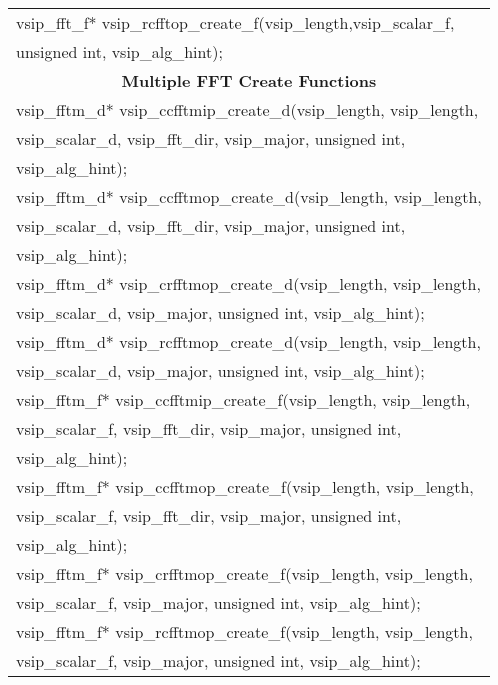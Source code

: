 {\begin{tabular}[H]{l}
vsip\_fft\_f* vsip\_rcfftop\_create\_f(vsip\_length,vsip\_scalar\_f,\\*\hspace{.7cm}unsigned int, vsip\_alg\_hint);\\
\hline \multicolumn{1}{c}{\rmfamily \bfseries Multiple FFT Create Functions}\\ \hline
vsip\_fftm\_d* vsip\_ccfftmip\_create\_d(vsip\_length, vsip\_length,\\*\hspace{.7cm}vsip\_scalar\_d, vsip\_fft\_dir, vsip\_major, unsigned int,\\*\hspace{.7cm}vsip\_alg\_hint);\\
vsip\_fftm\_d* vsip\_ccfftmop\_create\_d(vsip\_length, vsip\_length,\\*\hspace{.7cm}vsip\_scalar\_d, vsip\_fft\_dir, vsip\_major, unsigned int,\\*\hspace{.7cm}vsip\_alg\_hint);\\
vsip\_fftm\_d* vsip\_crfftmop\_create\_d(vsip\_length, vsip\_length,\\*\hspace{.7cm}vsip\_scalar\_d, vsip\_major, unsigned int, vsip\_alg\_hint);\\
vsip\_fftm\_d* vsip\_rcfftmop\_create\_d(vsip\_length, vsip\_length,\\*\hspace{.7cm}vsip\_scalar\_d, vsip\_major, unsigned int, vsip\_alg\_hint);\\
vsip\_fftm\_f* vsip\_ccfftmip\_create\_f(vsip\_length, vsip\_length,\\*\hspace{.7cm}vsip\_scalar\_f, vsip\_fft\_dir, vsip\_major, unsigned int,\\*\hspace{.7cm}vsip\_alg\_hint);\\
vsip\_fftm\_f* vsip\_ccfftmop\_create\_f(vsip\_length, vsip\_length,\\*\hspace{.7cm}vsip\_scalar\_f, vsip\_fft\_dir, vsip\_major, unsigned int,\\*\hspace{.7cm}vsip\_alg\_hint);\\
vsip\_fftm\_f* vsip\_crfftmop\_create\_f(vsip\_length, vsip\_length,\\*\hspace{.7cm}vsip\_scalar\_f, vsip\_major, unsigned int, vsip\_alg\_hint);\\
vsip\_fftm\_f* vsip\_rcfftmop\_create\_f(vsip\_length, vsip\_length,\\*\hspace{.7cm}vsip\_scalar\_f, vsip\_major, unsigned int, vsip\_alg\_hint);\\ \hline
\end{tabular}
}

